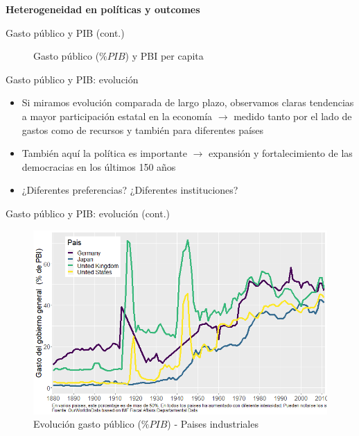 \documentclass[
  ignorenonframetext,
]{beamer}
\providecommand{\tightlist}{%
  \setlength{\itemsep}{0pt}\setlength{\parskip}{0pt}}\usepackage{longtable,booktabs,array}
\begin{document}
\begin{frame}{\textbf{Heterogeneidad en políticas y outcomes}}
\begin{block}{Gasto público y PIB (cont.)}
\begin{figure}
{}

\caption{Gasto público (\(\%PIB\)) y PBI per capita}

\end{figure}
\end{block}

\begin{block}{Gasto público y PIB: evolución}
\protect\hypertarget{gasto-puxfablico-y-pib-evoluciuxf3n}{}
\begin{itemize}
\tightlist
\item
  Si miramos evolución comparada de largo plazo, observamos claras
  tendencias a mayor participación estatal en la economía
  \(\longrightarrow\) medido tanto por el lado de gastos como de
  recursos y también para diferentes países
\item
  También aquí la política es importante \(\longrightarrow\) expansión y
  fortalecimiento de las democracias en los últimos 150 años
\item
  ¿Diferentes preferencias? ¿Diferentes instituciones?
\end{itemize}
\end{block}

\begin{block}{Gasto público y PIB: evolución (cont.)}
\protect\hypertarget{gasto-puxfablico-y-pib-evoluciuxf3n-cont.}{}
\begin{figure}

{\centering \includegraphics{fig/fig-01-002.png}

}

\caption{Evolución gasto público (\(\%PIB\)) - Paises industriales}

\end{figure}
\end{block}


\end{frame}
\end{document}
